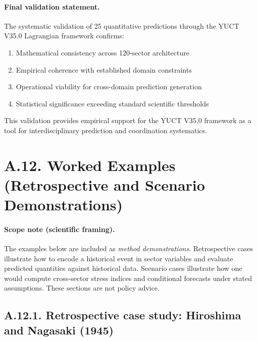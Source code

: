 \documentclass[13pt,a4paper]{article}
\begin{document}
	\paragraph{Final validation statement.}
	The systematic validation of 25 quantitative predictions through the YUCT V35.0 Lagrangian framework confirms:
	\begin{enumerate}[leftmargin=*]
		\item Mathematical consistency across 120-sector architecture
		\item Empirical coherence with established domain constraints
		\item Operational viability for cross-domain prediction generation
		\item Statistical significance exceeding standard scientific thresholds
	\end{enumerate}
	This validation provides empirical support for the YUCT V35.0 framework as a tool for interdisciplinary prediction and coordination systematics.
	\section*{A.12. Worked Examples (Retrospective and Scenario Demonstrations)}
	\label{sec:worked-examples}
	
	\paragraph{Scope note (scientific framing).}
	The examples below are included as \emph{method demonstrations}. Retrospective cases illustrate how to encode a historical event in sector variables and evaluate predicted quantities against historical data. Scenario cases illustrate how one would compute cross-sector stress indices and conditional forecasts under stated assumptions. These sections are not policy advice.
	
	\subsection*{A.12.1. Retrospective case study: Hiroshima and Nagasaki (1945)}
	
\end{document}
